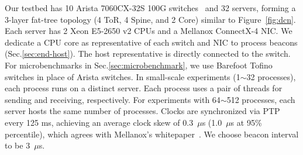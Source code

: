 Our testbed has 10 Arista 7060CX-32S 100G switches~\cite{arista} and 32 servers, forming a 3-layer fat-tree topology (4 ToR, 4 Spine, and 2 Core) similar to Figure~\ref{fig:dcn}.
Each server has 2 Xeon E5-2650 v2 CPUs and a Mellanox ConnectX-4 NIC. %
We dedicate a CPU core as representative of each switch and NIC to process beacons (Sec.\ref{sec:end-host}). The host representative is directly connected to the switch. %
For microbenchmarks in Sec.\ref{sec:microbenchmark}, we use Barefoot Tofino~\cite{tofino} switches in place of Arista switches.
In small-scale experiments (1$\sim$32 processes), each process runs on a distinct server. Each process uses a pair of threads for sending and receiving, respectively.
For experiments with 64$\sim$512 processes, each server hosts the same number of processes.
Clocks are synchronized via PTP~\cite{correll2005design} every 125 ms, achieving an average clock skew of 0.3~$\mu$s (1.0~$\mu$s at 95\% percentile), which agrees with Mellanox's whitepaper~\cite{mellanox-ptp}.
We choose beacon interval to be 3~$\mu$s.


\iffalse
\begin{table}[t]
\centering
{}
\caption{Network topologies for evaluation.}
\label{tab:eval-topology}
\end{table}

